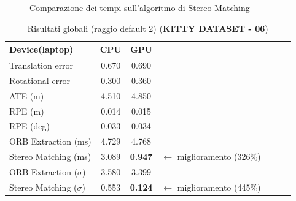 \documentclass[12pt,a4paper]{report}
\begin{document}
\begin{figure}[H]
    \centering
    \caption{Comparazione dei tempi sull'algoritmo di Stereo Matching }
\end{figure}


\newpage
\begin{table}[H]
    \centering
    \caption{Risultati globali (raggio default 2) (\textbf{KITTY DATASET - 06}) }
    \begin{tabular}{lcccccc}
        \toprule
        \rowcolor{gray!20}
        Device(laptop) & \cellcolor{blue!20}CPU & \cellcolor{orange!20}GPU  \\
        \midrule
        Translation error & \cellcolor{green!20}0.670 & 0.690  \\
        Rotational error  & \cellcolor{green!20}0.300 & 0.360  \\
        ATE (m)           & \cellcolor{green!20}4.510 & 4.850  \\
        RPE (m)           & \cellcolor{green!20}0.014 & 0.015  \\
        RPE (deg)         & \cellcolor{green!20}0.033 & 0.034  \\
        ORB Extraction (ms) & \cellcolor{green!20}4.729 & 4.768 &&  \\
        Stereo Matching (ms) & 3.089 & \cellcolor{green!20}\textbf{0.947} & $\xleftarrow{}$ miglioramento (326\%) \\
        ORB Extraction ($\sigma$) & 3.580 & \cellcolor{green!20}3.399  \\
        Stereo Matching ($\sigma$) & 0.553 & \cellcolor{green!20}\textbf{0.124} & $\xleftarrow{}$ miglioramento (445\%) \\
        \bottomrule
    \end{tabular}
\end{table}
\end{document}
